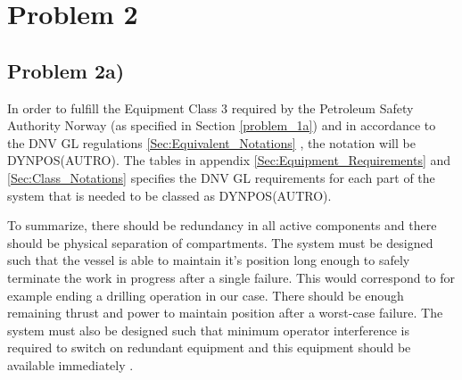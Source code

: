 \section{Problem 2}
\subsection{Problem 2a)}

In order to fulfill the Equipment Class 3 required by the Petroleum Safety Authority Norway (as specified in Section \ref{problem_1a}) and in accordance to the DNV GL regulations \ref{Sec:Equivalent_Notations} \cite{RecommendedPractices_DP_DNVGL}, the notation will be DYNPOS(AUTRO). The tables in appendix \ref{Sec:Equipment_Requirements} and \ref{Sec:Class_Notations} specifies the DNV GL requirements for each part of the system that is needed to be classed as DYNPOS(AUTRO). 

To summarize, there should be redundancy in all active components and there should be physical separation of compartments. The system must be designed such that the vessel is able to maintain it's position long enough to safely terminate the work in progress after a single failure. This would correspond to for example ending a drilling operation in our case. There should be enough remaining thrust and power to maintain position after a worst-case failure. The system must also be designed such that minimum operator interference is required to switch on redundant equipment and this equipment should be available immediately \cite{RulesShipsDNVGLPart6Chap3}.




